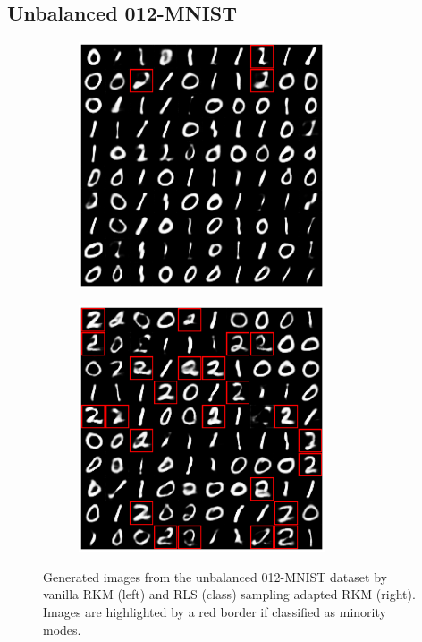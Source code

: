 \subsection{Unbalanced 012-MNIST}
\begin{figure}[H]
    \centering
    \begin{subfigure}{0.45\textwidth}
        \centering
        \includegraphics[width=0.8\textwidth]{Figures/Methods/rkm-mnist012-gensamples-highlighted-minorities.png}
    \end{subfigure}
    \hfill
    \begin{subfigure}{0.45\textwidth}
        \centering
        \includegraphics[width=0.8\textwidth]{Figures/Methods/RLS-mnist012-gensamples-highlighted-minorities.png}
    \end{subfigure}
    \caption{Generated images from the unbalanced 012-MNIST dataset by vanilla RKM (left) and RLS (class) sampling adapted RKM (right). Images are highlighted by a red border if classified as minority modes.}
    \label{fig-gensamples-ubmnist012-rls}
\end{figure}


